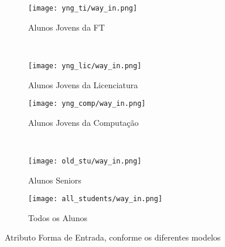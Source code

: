 \clearpage
\begin{figure}[!ht]
    \centering
    \begin{subfigure}[b]{0.48\textwidth}
        \centering
        \texttt{[image: yng\_ti/way\_in.png]}
        \caption{Alunos Jovens da FT}
    \end{subfigure}
    ~
    \begin{subfigure}[b]{0.48\textwidth}
        \centering
        \texttt{[image: yng\_lic/way\_in.png]}
        \caption{Alunos Jovens da Licenciatura}
    \end{subfigure}

    \begin{subfigure}[b]{0.48\textwidth}
        \centering
        \texttt{[image: yng\_comp/way\_in.png]}
        \caption{Alunos Jovens da Computação}
    \end{subfigure}
    ~
    \begin{subfigure}[b]{0.48\textwidth}
        \centering
        \texttt{[image: old\_stu/way\_in.png]}
        \caption{Alunos Seniors}
    \end{subfigure}

    \begin{subfigure}[b]{0.48\textwidth}
        \centering
        \texttt{[image: all\_students/way\_in.png]}
        \caption{Todos os Alunos}
    \end{subfigure}
    \caption{Atributo Forma de Entrada, conforme os diferentes modelos}
\end{figure}

